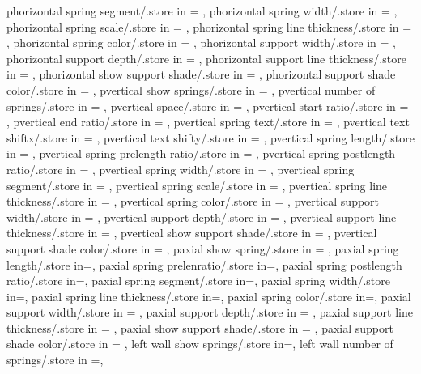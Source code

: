 {  phorizontal spring segment/.store in = \phorsegm,
  phorizontal spring width/.store in = \phorsprwid,
  phorizontal spring scale/.store in = \phorsprscale,
  phorizontal spring line thickness/.store in = \phorsprlinethk,
  phorizontal spring color/.store in = \phorsprcolor,
  phorizontal support width/.store in = \phorsuppwidth,
  phorizontal support depth/.store in = \phorsuppdepth,
  phorizontal support line thickness/.store in = \phorsupplinethk,
  phorizontal show support shade/.store in = \phorshowsuppshade,
  phorizontal support shade color/.store in = \phorsuppshadecol,
  pvertical show springs/.store in = \showpverticalsprings,
  pvertical number of springs/.store in = \pverspringnumber,
  pvertical space/.store in = \pverspringspace,
  pvertical start ratio/.store in = \pverspringstartratio,
  pvertical end ratio/.store in = \pverspringendratio,
  pvertical spring text/.store in = \pverspringtext,
  pvertical text shiftx/.store in = \pvertextshiftx,
  pvertical text shifty/.store in = \pvertextshifty,
  pvertical spring length/.store in = \pverspringlength,
  pvertical spring prelength ratio/.store in = \pverprelenratio,
  pvertical spring postlength ratio/.store in = \pverpostlenratio,
  pvertical spring width/.store in = \pverampl,
  pvertical spring segment/.store in = \pversegm,
  pvertical spring scale/.store in = \pverspringscale,
  pvertical spring line thickness/.store in = \pverspringthk,
  pvertical spring color/.store in = \pverspringcolor,
  pvertical support width/.store in = \pversuppwidth,
  pvertical support depth/.store in = \pversuppdepth,
  pvertical support line thickness/.store in = \pversupplinethk,
  pvertical show support shade/.store in = \pvershowsuppshade,
  pvertical support shade color/.store in = \pversuppshadecol,
  paxial show spring/.store in = \showpaxialspring,
  paxial spring length/.store in=\paxialspringlength,
  paxial spring prelenratio/.store in=\paxialspringprelenratio,
  paxial spring postlength ratio/.store in=\paxialspringpostlenratio,
  paxial spring segment/.store in=\paxialspringsegm,
  paxial spring width/.store in=\paxialspringwidth,
  paxial spring line thickness/.store in=\paxialspringlinethk,
  paxial spring color/.store in=\paxialspringcolor,
  paxial support width/.store in = \paxialsuppwidth,
  paxial support depth/.store in = \paxialsuppdepth,
  paxial support line thickness/.store in = \paxialsupplinethk,
  paxial show support shade/.store in = \paxialshowsuppshade,
  paxial support shade color/.store in = \paxialsuppshadecol,
  left wall show springs/.store in=\leftwshowsprings,
  left wall number of springs/.store in =\leftwspringnumber,
}
